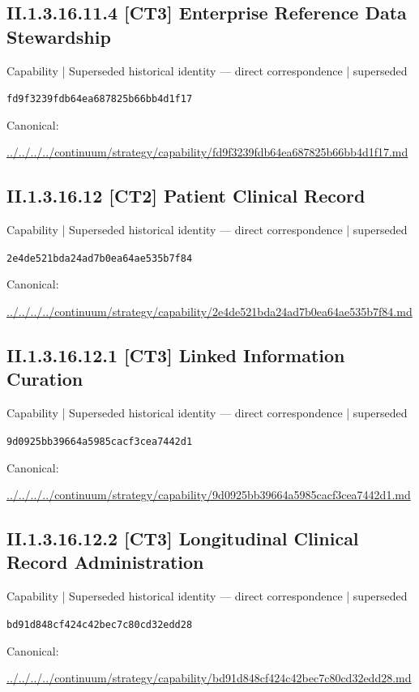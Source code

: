 \documentclass[10pt,a4paper]{article}
\begin{document}
\subsection*{II.1.3.16.11.4 [CT3] Enterprise Reference Data Stewardship}
{\small Capability | Superseded historical identity — direct correspondence | superseded}\par
\texttt{fd9f3239fdb64ea687825b66bb4d1f17}\par
Canonical: \par
{\footnotesize\url{../../../../continuum/strategy/capability/fd9f3239fdb64ea687825b66bb4d1f17.md}}\par
\subsection*{II.1.3.16.12 [CT2] Patient Clinical Record}
{\small Capability | Superseded historical identity — direct correspondence | superseded}\par
\texttt{2e4de521bda24ad7b0ea64ae535b7f84}\par
Canonical: \par
{\footnotesize\url{../../../../continuum/strategy/capability/2e4de521bda24ad7b0ea64ae535b7f84.md}}\par
\subsection*{II.1.3.16.12.1 [CT3] Linked Information Curation}
{\small Capability | Superseded historical identity — direct correspondence | superseded}\par
\texttt{9d0925bb39664a5985cacf3cea7442d1}\par
Canonical: \par
{\footnotesize\url{../../../../continuum/strategy/capability/9d0925bb39664a5985cacf3cea7442d1.md}}\par
\subsection*{II.1.3.16.12.2 [CT3] Longitudinal Clinical Record Administration}
{\small Capability | Superseded historical identity — direct correspondence | superseded}\par
\texttt{bd91d848cf424c42bec7c80cd32edd28}\par
Canonical: \par
{\footnotesize\url{../../../../continuum/strategy/capability/bd91d848cf424c42bec7c80cd32edd28.md}}\par
\end{document}
